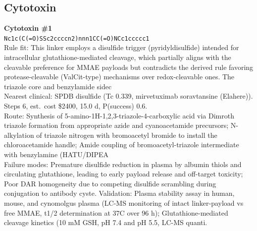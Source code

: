 \documentclass[10pt]{article}
\begin{document}
\subsection{Cytotoxin}
\noindent\textbf{Cytotoxin \#1} \\ \texttt{Nc1c(C(=O)SSc2ccccn2)nnn1CC(=O)NCc1ccccc1} \\ Rule fit: This linker employs a disulfide trigger (pyridyldisulfide) intended for intracellular glutathione-mediated cleavage, which partially aligns with the cleavable preference for MMAE payloads but contradicts the derived rule favoring protease-cleavable (ValCit-type) mechanisms over redox-cleavable ones. The triazole core and benzylamide sidec \\ Nearest clinical: SPDB disulfide (Tc 0.339, mirvetuximab soravtansine (Elahere)). Steps 6, est.\ cost \$2400, 15.0 d, P(success) 0.6. \\ Route: Synthesis of 5-amino-1H-1,2,3-triazole-4-carboxylic acid via Dimroth triazole formation from appropriate azide and cyanoacetamide precursors; N-alkylation of triazole nitrogen with bromoacetyl bromide to install the chloroacetamide handle; Amide coupling of bromoacetyl-triazole intermediate with benzylamine (HATU/DIPEA \\ Failure modes: Premature disulfide reduction in plasma by albumin thiols and circulating glutathione, leading to early payload release and off-target toxicity; Poor DAR homogeneity due to competing disulfide scrambling during conjugation to antibody cyste. Validation: Plasma stability assay in human, mouse, and cynomolgus plasma (LC-MS monitoring of intact linker-payload vs free MMAE, t1/2 determination at 37\textdegree{}C over 96 h); Glutathione-mediated cleavage kinetics (10 mM GSH, pH 7.4 and pH 5.5, LC-MS quanti. \\[0.4em]
\end{document}
